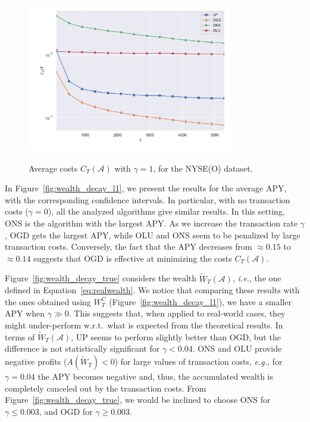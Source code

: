 \begin{figure}[ht!]
\centering
{\includegraphics[width=0.80\textwidth,keepaspectratio]{img/fig_costs.pdf}}
\caption{Average costs $C_T(\mathcal{A})$ with $\gamma = 1$, for the NYSE(O) dataset.}
\label{fig:costs}
\end{figure}

In Figure~\ref{fig:wealth_decay_l1}, we present the results for the average APY, with the corresponding confidence intervals.
In particular, with no transaction costs ($\gamma = 0$), all the analyzed algorithms give similar results.
In this setting, ONS is the algorithm with the largest APY.
As we increase the transaction rate $\gamma$, OGD gets the largest APY, while OLU and ONS seem to be penalized by large transaction costs.
Conversely, the fact that the APY decreases from $\approx 0.15$ to $\approx 0.14$ suggests that OGD is effective at minimizing the costs $C_T(\mathcal{A})$.

Figure~\ref{fig:wealth_decay_true} considers the wealth $\tilde{W}_T(\mathcal{A})$, \emph{i.e.}, the one defined in Equation~\eqref{eq:realwealth}.
We notice that comparing these results with the ones obtained using $W_T^C$ (Figure~\ref{fig:wealth_decay_l1}), we have a smaller APY when $\gamma \gg 0$.
This suggests that, when applied to real-world cases, they might under-perform w.r.t.~what is expected from the theoretical results. 
In terms of $\tilde{W}_T(\mathcal{A})$, UP seems to perform slightly better than OGD, but the difference is not statistically significant for $\gamma < 0.04$.
ONS and OLU provide negative profits ($A(\tilde{W}_T) < 0$) for large values of transaction costs, \emph{e.g.}, for $\gamma = 0.04$ the APY becomes negative and, thus, the accumulated wealth is completely canceled out by the transaction costs.
From Figure~\ref{fig:wealth_decay_true}, we would be inclined to choose ONS for $\gamma \leq 0.003$, and OGD for $\gamma \geq 0.003$.

